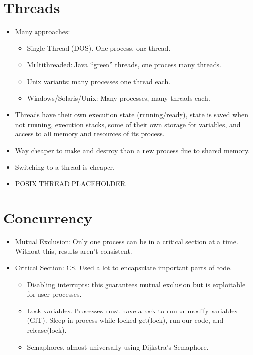 \documentclass[fontsize=5pt]{scrartcl}
\begin{document}
\begin{multicols}{3}
     \section{Threads}
      \begin{itemize}
       \item Many approaches: 
       \begin{itemize}
        \item Single Thread (DOS). One process, one thread.
        \item Multithreaded: Java ``green'' threads, one process many threads.
        \item Unix variants: many processes one thread each.
        \item Windows/Solaris/Unix: Many processes, many threads each.
       \end{itemize}
       \item Threads have their own execution state (running/ready), state is saved when not running, execution stacks, 
             some of their own storage for variables, and access to all memory and resources of its process.
       \item Way cheaper to make and destroy than a new process due to shared memory.
       \item Switching to a thread is cheaper.
       \item {{POSIX THREAD PLACEHOLDER}}
      \end{itemize}
      
      \section{Concurrency}
        \begin{itemize}
          \item Mutual Exclusion: Only one process can be in a critical section at a time. Without this, results aren't consistent.
          \item Critical Section: CS. Used a lot to encapsulate important parts of code.
  
         \begin{itemize}
          \item Disabling interrupts: this guarantees mutual exclusion but is exploitable for user processes. 
          \item Lock variables: Processes must have a lock to run or modify variables (GIT). Sleep in process while locked
                get(lock), run our code, and release(lock).
          \item Semaphores, almost universally using Dijkstra's Semaphore.
         \end{itemize}


\end{itemize}
\end{multicols}
\end{document}
